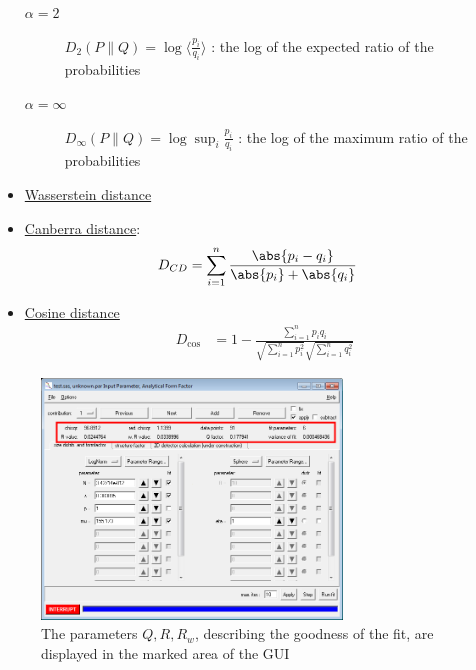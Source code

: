 \begin{itemize}
\begin{description}
        \item[$\alpha=2$] $D_{2}(P\|Q)=\log {\Big \langle }{\frac {p_{i}}{q_{i}}}{\Big \rangle }$ : the log of the expected ratio of the probabilities
        \item[$\alpha=\infty$] $D_\infty (P\|Q)=\log \sup_i\frac {p_i}{q_i}$ : the log of the maximum ratio of the probabilities
    \end{description}
  \item \href{https://github.com/stegua/ot1d}{Wasserstein distance} %
  \item \href{https://en.wikipedia.org/wiki/Canberra_distance}{Canberra distance}:
\begin{align}
    D_{CD}&= \sum_{i=1}^n\frac{\abs{p_i-q_i}}{\abs{p_i}+\abs{q_i}}
\end{align}
  \item \href{https://en.wikipedia.org/wiki/Cosine_similarity}{Cosine distance}
\begin{align}
    D_{\cos}&= 1-\frac{\sum_{i=1}^n p_iq_i}{\sqrt{\sum_{i=1}^n p_i^2}\sqrt{\sum_{i=1}^n q_i^2}}
\end{align}

\end{itemize}


\begin{figure}[htb]
\begin{center}
\includegraphics[width=0.712\textwidth]{../images/related_pages/goodnessOFfitPAR.png}
\end{center}
\caption{The parameters $Q, R,R_w$, describing the goodness of the fit, are displayed in the marked area of the GUI}
\label{fig:GoodnessParGUI}
\end{figure}

